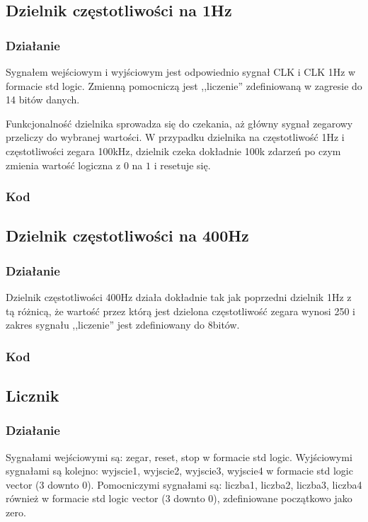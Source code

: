 \subsection{Dzielnik częstotliwości na 1Hz}
\subsubsection{Działanie}
\hspace*{0.5cm}Sygnałem wejściowym i wyjściowym jest odpowiednio sygnał CLK i CLK 1Hz w formacie std logic. Zmienną pomocniczą jest ,,liczenie'' zdefiniowaną w zagresie do 14 bitów danych.

\vspace*{0.5cm}

\hspace*{0.5cm}Funkcjonalność dzielnika sprowadza się do czekania, aż główny sygnał zegarowy przeliczy do wybranej wartości. W przypadku dzielnika na częstotliwość 1Hz i częstotliwości zegara 100kHz, dzielnik czeka dokładnie 100k zdarzeń po czym zmienia wartość logiczna z $0$ na $1$ i resetuje się.
\subsubsection{Kod}


\clearpage\subsection{Dzielnik częstotliwości na 400Hz}
\subsubsection{Działanie}
\hspace*{0.5cm}Dzielnik częstotliwości 400Hz działa dokładnie tak jak poprzedni dzielnik 1Hz z tą różnicą, że wartość przez którą jest dzielona częstotliwość zegara wynosi 250 i zakres sygnału ,,liczenie'' jest zdefiniowany do 8bitów.
\subsubsection{Kod}


\subsection{Licznik}
\subsubsection{Działanie}
\hspace*{0.5cm}Sygnałami wejściowymi są: zegar, reset, stop w formacie std logic. Wyjściowymi sygnałami są kolejno: wyjscie1, wyjscie2, wyjscie3, wyjscie4 w formacie std logic vector (3 downto 0). Pomocniczymi sygnałami są: liczba1, liczba2, liczba3, liczba4 również w formacie std logic vector (3 downto 0), zdefiniowane początkowo jako zero.

